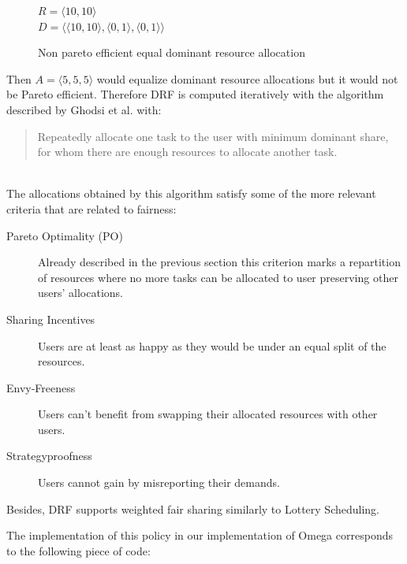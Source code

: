 \documentclass{report}                     %
\begin{document}
\begin{figure}[!ht]
\centering
$R = \langle 10, 10 \rangle$ \\
$D = \langle \langle 10, 10 \rangle, \langle 0, 1 \rangle, \langle 0, 1 \rangle \rangle$ \\
\caption{Non pareto efficient equal dominant resource allocation}
\label{fig:nonpareto}
\end{figure}

Then $A = \langle 5, 5, 5 \rangle$ would equalize dominant resource
allocations but it would not be Pareto efficient. Therefore DRF is computed
iteratively with the algorithm described by Ghodsi et al. with: \\

\blockquote{Repeatedly allocate one task to the user with minimum dominant
share, for whom there are enough resources to allocate another task.} \\

The allocations obtained by this algorithm satisfy some of the more
relevant criteria that are related to fairness: \\

\begin{description}
  \item[Pareto Optimality (PO)] Already described in the previous
  section this criterion marks a repartition of resources where
  no more tasks can be allocated to user preserving other users'
  allocations.
  \item[Sharing Incentives]  Users are at least as happy as they
  would be under an equal split of the resources.
  \item[Envy-Freeness] Users can't benefit from swapping their
  allocated resources with other users.
  \item[Strategyproofness] Users cannot gain by misreporting
  their demands.
\end{description}

Besides, DRF supports weighted fair sharing similarly to Lottery
Scheduling. 

The implementation of this policy in our implementation of Omega
corresponds to the following piece of code:
\end{document}
